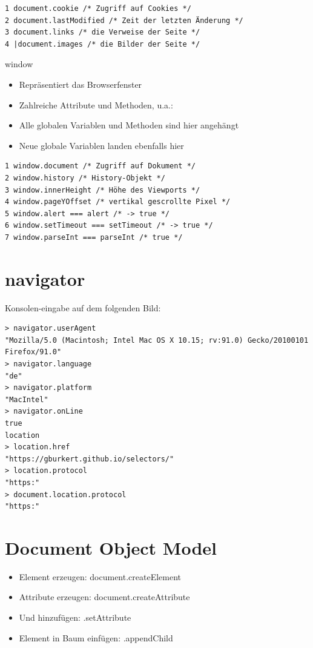 \documentclass[10pt]{article}
\begin{document}
\begin{verbatim}
1 document.cookie /* Zugriff auf Cookies */
2 document.lastModified /* Zeit der letzten Änderung */
3 document.links /* die Verweise der Seite */
4 |document.images /* die Bilder der Seite */
\end{verbatim}

window

\begin{itemize}
  \item Repräsentiert das Browserfenster
  \item Zahlreiche Attribute und Methoden, u.a.:
  \item Alle globalen Variablen und Methoden sind hier angehängt
  \item Neue globale Variablen landen ebenfalls hier
\end{itemize}

\begin{verbatim}
1 window.document /* Zugriff auf Dokument */
2 window.history /* History-Objekt */
3 window.innerHeight /* Höhe des Viewports */
4 window.pageYOffset /* vertikal gescrollte Pixel */
5 window.alert === alert /* -> true */
6 window.setTimeout === setTimeout /* -> true */
7 window.parseInt === parseInt /* true */
\end{verbatim}

\section*{navigator}
Konsolen-eingabe auf dem folgenden Bild:

\begin{verbatim}
> navigator.userAgent
"Mozilla/5.0 (Macintosh; Intel Mac OS X 10.15; rv:91.0) Gecko/20100101 Firefox/91.0"
> navigator.language
"de"
> navigator.platform
"MacIntel"
> navigator.onLine
true
location
> location.href
"https://gburkert.github.io/selectors/"
> location.protocol
"https:"
> document.location.protocol
"https:"
\end{verbatim}

\section*{Document Object Model}
\begin{itemize}
  \item Element erzeugen: document.createElement
  \item Attribute erzeugen: document.createAttribute
  \item Und hinzufügen: .setAttribute
  \item Element in Baum einfügen: .appendChild
\end{itemize}
\end{document}
